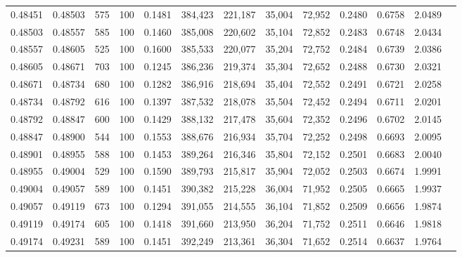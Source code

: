 \begin{tabular}{rrrrrrrrrrrrr}
0.48451 & 0.48503 &   575 & 100 &                                     0.1481 & 384,423 & 221,187 &  35,004 &  72,952 & 0.2480 & 0.6758 & 2.0489 \\
0.48503 & 0.48557 &   585 & 100 &                                     0.1460 & 385,008 & 220,602 &  35,104 &  72,852 & 0.2483 & 0.6748 & 2.0434 \\
0.48557 & 0.48605 &   525 & 100 &                                     0.1600 & 385,533 & 220,077 &  35,204 &  72,752 & 0.2484 & 0.6739 & 2.0386 \\
0.48605 & 0.48671 &   703 & 100 &                                     0.1245 & 386,236 & 219,374 &  35,304 &  72,652 & 0.2488 & 0.6730 & 2.0321 \\
0.48671 & 0.48734 &   680 & 100 &                                     0.1282 & 386,916 & 218,694 &  35,404 &  72,552 & 0.2491 & 0.6721 & 2.0258 \\
0.48734 & 0.48792 &   616 & 100 &                                     0.1397 & 387,532 & 218,078 &  35,504 &  72,452 & 0.2494 & 0.6711 & 2.0201 \\
0.48792 & 0.48847 &   600 & 100 &                                     0.1429 & 388,132 & 217,478 &  35,604 &  72,352 & 0.2496 & 0.6702 & 2.0145 \\
0.48847 & 0.48900 &   544 & 100 &                                     0.1553 & 388,676 & 216,934 &  35,704 &  72,252 & 0.2498 & 0.6693 & 2.0095 \\
0.48901 & 0.48955 &   588 & 100 &                                     0.1453 & 389,264 & 216,346 &  35,804 &  72,152 & 0.2501 & 0.6683 & 2.0040 \\
0.48955 & 0.49004 &   529 & 100 &                                     0.1590 & 389,793 & 215,817 &  35,904 &  72,052 & 0.2503 & 0.6674 & 1.9991 \\
0.49004 & 0.49057 &   589 & 100 &                                     0.1451 & 390,382 & 215,228 &  36,004 &  71,952 & 0.2505 & 0.6665 & 1.9937 \\
0.49057 & 0.49119 &   673 & 100 &                                     0.1294 & 391,055 & 214,555 &  36,104 &  71,852 & 0.2509 & 0.6656 & 1.9874 \\
0.49119 & 0.49174 &   605 & 100 &                                     0.1418 & 391,660 & 213,950 &  36,204 &  71,752 & 0.2511 & 0.6646 & 1.9818 \\
0.49174 & 0.49231 &   589 & 100 &                                     0.1451 & 392,249 & 213,361 &  36,304 &  71,652 & 0.2514 & 0.6637 & 1.9764 \\

\end{tabular}
